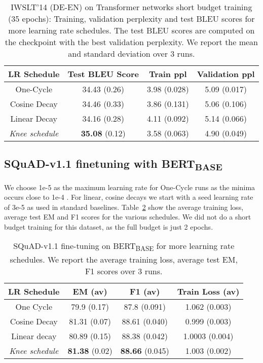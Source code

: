 \documentclass{article} \usepackage{iclr2021_conference,times}
\newcommand{\lrschedule}{\textit{Knee schedule}}
\begin{document}
\begin{table}[h]
\small
\centering
\caption{IWSLT'14 (DE-EN) on Transformer networks short budget training (35 epochs): Training, validation perplexity and test BLEU scores for more learning rate schedules. The test BLEU scores are computed on the checkpoint with the best validation perplexity. We report the mean and standard deviation over 3 runs.}
\label{tab:iwslt_results_extra_baselines_short_budget}
\begin{tabular}{cccc}
  \toprule
  LR Schedule   & Test BLEU Score & Train ppl & Validation ppl    \\
  \midrule
  One-Cycle     &  34.43 (0.26) & 3.98 (0.028)  & 5.09 (0.017)     \\
  Cosine Decay  &  34.46 (0.33) & 3.86 (0.131)   & 5.06 (0.106)   \\
  Linear Decay  & 34.16  (0.28) & 4.11 (0.092)   & 5.14 (0.066)   \\
  \lrschedule{} & \textbf{35.08} (0.12) & 3.58 (0.063)   & 4.90 (0.049)    \\ 
  \bottomrule
\end{tabular}

\end{table}


\subsection{SQuAD-v1.1 finetuning with BERT\textsubscript{BASE}}
We choose 1e-5 as the maximum learning rate for One-Cycle runs as the minima occurs close to 1e-4 . For linear, cosine decays we start with a seed learning rate of 3e-5 as used in standard baselines.  Table~\ref{tab:squad_results_extra_baselines} show the average training loss, average test EM and F1 scores for the various schedules. We did not do a short budget training for this dataset, as the full budget is just 2 epochs.

\begin{table}[h!]
\small
\centering
\caption{SQuAD-v1.1 fine-tuning on BERT\textsubscript{BASE} for more learning rate schedules. We report the average training loss, average test EM, F1 scores over 3 runs.}
\label{tab:squad_results_extra_baselines}
\begin{tabular}{cccc}
  \toprule
  LR Schedule    & EM (av)  & F1 (av) & Train Loss (av)  \\ 
  \midrule
  One Cycle        & 79.9 (0.17) & 87.8 (0.091) & 1.062 (0.003) \\
  Cosine Decay      & 81.31 (0.07) & 88.61 (0.040) & 0.999 (0.003) \\
  Linear decay      & 80.89 (0.15) & 88.38 (0.042) & 1.0003 (0.004)\\
  \lrschedule{}     & \textbf{81.38} (0.02)  & \textbf{88.66} (0.045) & 1.003 (0.002)\\
  \bottomrule
\end{tabular}

\end{table} \clearpage
\end{document}
